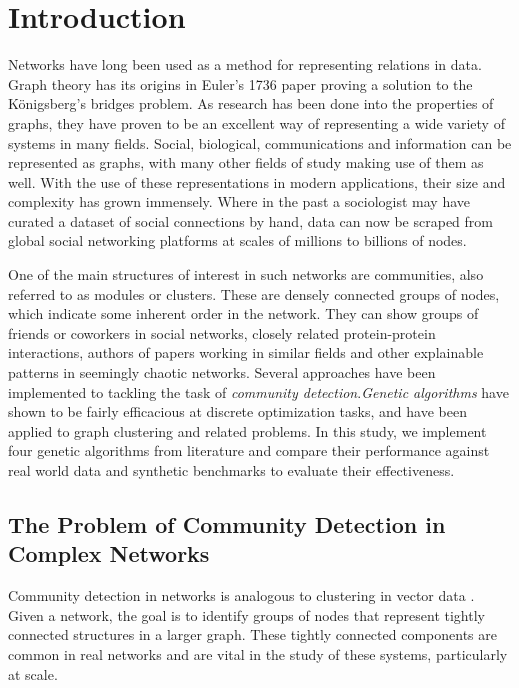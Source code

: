 \chapter{Introduction}
\label{ch:intro:introduction}
Networks have long been used as a method for representing relations in data. Graph theory has its origins in Euler's 1736 paper proving a solution to the K\"{o}nigsberg's bridges problem. As research has been done into the properties of graphs, they have proven to be an excellent way of representing a wide variety of systems in many fields. Social, biological, communications and information can be represented as graphs, with many other fields of study making use of them as well. With the use of these representations in modern applications, their size and complexity has grown immensely. Where in the past a sociologist may have curated a dataset of social connections by hand, data can now be scraped from global social networking platforms at scales of millions to billions of nodes. 

One of the main structures of interest in such networks are communities, also referred to as modules or clusters. These are densely connected groups of nodes, which indicate some inherent order in the network. They can show groups of friends or coworkers in social networks, closely related protein-protein interactions, authors of papers working in similar fields and other explainable patterns in seemingly chaotic networks. Several approaches have been implemented to tackling the task of \textit{community detection}.\textit{Genetic algorithms} have shown to be fairly efficacious at discrete optimization tasks, and have been applied to graph clustering and related problems. In this study, we implement four genetic algorithms from literature and compare their performance against real world data and synthetic benchmarks to evaluate their effectiveness.


\pagebreak

\section{The Problem of Community Detection in Complex Networks}
Community detection in networks is analogous to clustering in vector data \cite{Peel2016}. Given a network, the goal is to identify groups of nodes that represent tightly connected structures in a larger graph. These tightly connected components are common in real networks and are vital in the study of these systems, particularly at scale.

